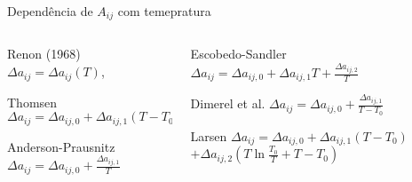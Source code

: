 \documentclass{beamer}
\begin{document}
\begin{frame}{Dependência de $A_{ij}$ com temepratura}
\begin{columns}
\begin{column}{5cm}
			\begin{block}{Renon (1968)}
$\Delta a_{ij}=\Delta a_{ij}(T)$,
			\end{block}
			\begin{block}{Thomsen}
$ \Delta a_{ij}=\Delta a_{ij,0}+\Delta a_{ij,1}(T-T_0)$
			\end{block}
%
			\begin{block}{Anderson-Prausnitz}			
$ \Delta a_{ij}=\Delta a_{ij,0}+\frac{\Delta a_{ij,1}}{T}$
			\end{block}
%
		\end{column}
		\begin{column}{5cm}
			\begin{block}{Escobedo-Sandler}
$ \Delta a_{ij}=\Delta a_{ij,0}+\Delta a_{ij,1} T
 +\frac{\Delta a_{ij,2}}{T}$
			\end{block}
			\begin{block}{Dimerel et al.}
$ \Delta a_{ij}=\Delta a_{ij,0}+\frac{\Delta a_{ij,1}}{T-T_0}$
			\end{block}
%
			\begin{block}{Larsen}			
$ \Delta a_{ij}=\Delta a_{ij,0}+\Delta a_{ij,1}(T-T_0) $
$ +\Delta a_{ij,2} \left(T\ln \frac{T_0}{T} + T - T_0 \right)$
			\end{block}
%
		\end{column}
	\end{columns}
\end{frame}
\end{document}
